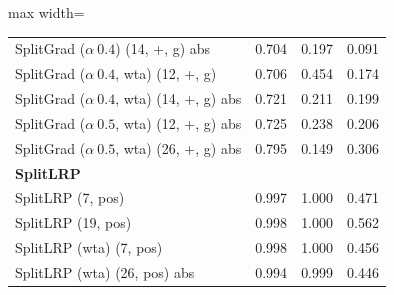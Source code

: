\begin{table}[htbp]
{\begin{adjustbox}{max width=\linewidth}
\begin{tabular}{l c c c}
SplitGrad ($\alpha \ 0.4$) (14, +, g) abs & 0.704 & 0.197 & 0.091 \\
SplitGrad ($\alpha \ 0.4$, wta) (12, +, g) & 0.706 & 0.454 & 0.174 \\
SplitGrad ($\alpha \ 0.4$, wta) (14, +, g) abs & 0.721 & 0.211 & 0.199 \\
SplitGrad ($\alpha \ 0.5$, wta) (12, +, g) abs & 0.725 & 0.238 & 0.206 \\
SplitGrad ($\alpha \ 0.5$, wta) (26, +, g) abs & 0.795 & 0.149 & 0.306 \\
\midrule
\multicolumn{4}{l}{\textbf{SplitLRP}} \\
SplitLRP (7, pos) & 0.997 & 1.000 & 0.471 \\
SplitLRP (19, pos) & 0.998 & 1.000 & 0.562 \\
SplitLRP (wta) (7, pos) & 0.998 & 1.000 & 0.456 \\
SplitLRP (wta) (26, pos) abs & 0.994 & 0.999 & 0.446 \\
\bottomrule
\end{tabular}
\end{adjustbox}
}%
\end{table}
